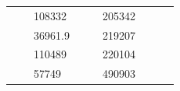 \begin{table}[]
\begin{tabular}{|cclccllll}
\multicolumn{1}{|c|}{\cellcolor[HTML]{FFFFC7}}                                & \multicolumn{1}{c|}{\cellcolor[HTML]{DAE8FC}}                      & \multicolumn{1}{l|}{\cellcolor[HTML]{DDFDFF}108332}    & \multicolumn{1}{c|}{\cellcolor[HTML]{FFFFC7}}                                & \multicolumn{1}{c|}{\cellcolor[HTML]{DAE8FC}}                       & \multicolumn{1}{l|}{\cellcolor[HTML]{DAE8FC}205342}    &                                                                              &                                                                    &                                                        \\ \cline{3-3} \cline{6-6}
\multicolumn{1}{|c|}{\cellcolor[HTML]{FFFFC7}}                                & \multicolumn{1}{c|}{\cellcolor[HTML]{DAE8FC}}                      & \multicolumn{1}{l|}{\cellcolor[HTML]{DAE8FC}36961.9}   & \multicolumn{1}{c|}{\cellcolor[HTML]{FFFFC7}}                                & \multicolumn{1}{c|}{\cellcolor[HTML]{DAE8FC}}                       & \multicolumn{1}{l|}{\cellcolor[HTML]{DDFDFF}219207}    &                                                                              &                                                                    &                                                        \\ \cline{3-3} \cline{6-6}
\multicolumn{1}{|c|}{\cellcolor[HTML]{FFFFC7}}                                & \multicolumn{1}{c|}{\cellcolor[HTML]{DAE8FC}}                      & \multicolumn{1}{l|}{\cellcolor[HTML]{DDFDFF}110489}    & \multicolumn{1}{c|}{\cellcolor[HTML]{FFFFC7}}                                & \multicolumn{1}{c|}{\cellcolor[HTML]{DAE8FC}}                       & \multicolumn{1}{l|}{\cellcolor[HTML]{DAE8FC}220104}    &                                                                              &                                                                    &                                                        \\ \cline{3-3} \cline{6-6}
\multicolumn{1}{|c|}{\cellcolor[HTML]{FFFFC7}}                                & \multicolumn{1}{c|}{\cellcolor[HTML]{DAE8FC}}                      & \multicolumn{1}{l|}{\cellcolor[HTML]{DAE8FC}57749}     & \multicolumn{1}{c|}{\cellcolor[HTML]{FFFFC7}}                                & \multicolumn{1}{c|}{\cellcolor[HTML]{DAE8FC}}                       & \multicolumn{1}{l|}{\cellcolor[HTML]{DDFDFF}490903}    &                                                                              &                                                                    &                                                        \\ \cline{3-3} \cline{6-6}

\end{tabular}
\end{table}
